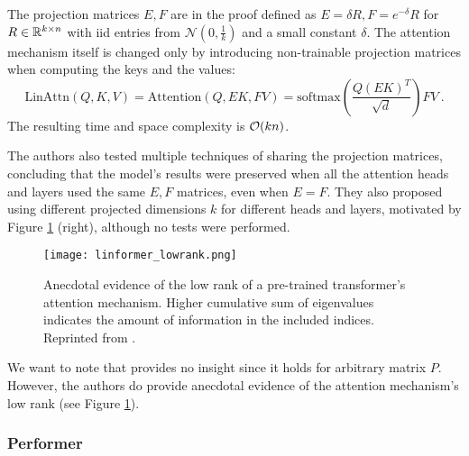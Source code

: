 The projection matrices $E, F$ are in the proof defined as $E=\delta R, F=e^{-\delta}R$ for $R\in\mathbb{R}^{k\times n}$ with iid entries from $\mathcal{N}(0,\frac{1}{k})$ and a small constant $\delta$.
The attention mechanism itself is changed only by introducing non-trainable projection matrices when computing the keys and the values:
\begin{equation}
        \text{LinAttn}(Q,K,V)=\text{Attention}(Q,EK,FV)=
        \text{softmax}\left(\frac{Q(EK)^T}{\sqrt{d}}\right)FV
        \ .
\end{equation}
The resulting time and space complexity is $\mathcal{O}(kn)$. 

The authors also tested multiple techniques of sharing the projection matrices, concluding that the model's results were preserved when all the attention heads and layers used the same $E,F$ matrices, even when $E=F$.
They also proposed using different projected dimensions $k$ for different heads and layers, motivated by Figure \ref{fig:linformer_lowrank} (right), although no tests were performed.

\begin{figure}[!htb]
        \centering
        \texttt{[image: linformer\_lowrank.png]}
        \caption[Rank of the Attention Mechanism]{Anecdotal evidence of the low rank of a pre-trained transformer's attention mechanism. Higher cumulative sum of eigenvalues indicates the amount of information in the included indices. Reprinted from \citep{linformer}.}
        \label{fig:linformer_lowrank}
\end{figure}

We want to note that \citep[Theorem 1]{linformer} provides no insight since it holds for arbitrary matrix $P$. 
However, the authors do provide anecdotal evidence of the
attention mechanism’s low rank (see Figure \ref{fig:linformer_lowrank}).

\subsubsection{Performer}

